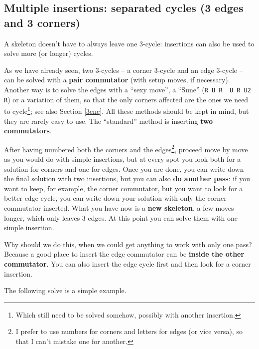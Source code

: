 \documentclass[11pt,a4paper]{book}
\newcommand{\p}{\textquotesingle}
\newcommand{\m}{\texttt}
\newcommand{\ps}{\p\,\,}
\begin{document}
\subsection{Multiple insertions: separated cycles (3 edges and 3 corners)}

A skeleton doesn't have to always leave one 3-cycle: insertions can also be used to solve more (or longer) cycles.

As we have already seen, two 3-cycles -- a corner 3-cycle and an edge 3-cycle -- can be solved with a \textbf{pair commutator} (with setup moves, if necessary). Another way is to solve the edges with a ``sexy move'', a ``Sune'' (\m{R U R\ps U R U2 R\p}) or a variation of them, so that the only corners affected are the ones we need to cycle\footnote{Which still need to be solved somehow, possibly with another insertion.}; see also Section \ref{3enc}. All these methods should be kept in mind, but they are rarely easy to use. The ``standard'' method is inserting \textbf{two commutators}.

After having numbered both the corners and the edges\footnote{I prefer to use numbers for corners and letters for edges (or vice versa), so that I can't mistake one for another.}, proceed move by move as you would do with simple insertions, but at every spot you look both for a solution for corners and one for edges. Once you are done, you can write down the final solution with two insertions, but you can also \textbf{do another pass}: if you want to keep, for example, the corner commutator, but you want to look for a better edge cycle, you can write down your solution with only the corner commutator inserted. What you have now is a \textbf{new skeleton}, a few moves longer, which only leaves 3 edges. At this point you can solve them with one simple insertion.

Why should we do this, when we could get anything to work with only one pass? Because a good place to insert the edge commutator can be \textbf{inside the other commutator}. You can also insert the edge cycle first and then look for a corner insertion.

The following solve is a simple example.
\end{document}
